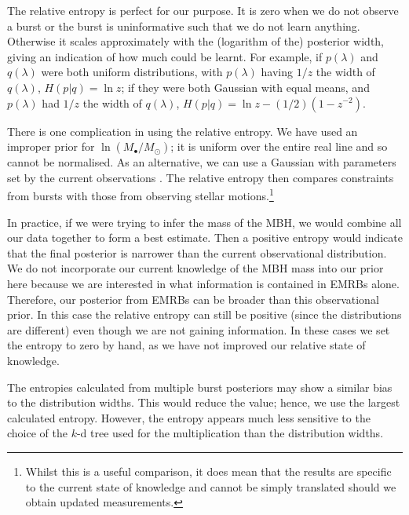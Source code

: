 The relative entropy is perfect for our purpose. It is zero when we do not observe a burst or the burst is uninformative such that we do not learn anything. Otherwise it scales approximately with the (logarithm of the) posterior width, giving an indication of how much could be learnt. For example, if $p(\lambda)$ and $q(\lambda)$ were both uniform distributions, with $p(\lambda)$ having $1/z$ the width of $q(\lambda)$, $H(p|q) = \ln z$; if they were both Gaussian with equal means, and $p(\lambda)$ had $1/z$ the width of $q(\lambda)$, $H(p|q) = \ln z - (1/2)(1 - z^{-2})$.

There is one complication in using the relative entropy. We have used an improper prior for $\ln (M_\bullet/M_\odot)$; it is uniform over the entire real line and so cannot be normalised. As an alternative, we can use a Gaussian with parameters set by the current observations \citep{Gillessen2009}. The relative entropy then compares constraints from bursts with those from observing stellar motions.\footnote{Whilst this is a useful comparison, it does mean that the results are specific to the current state of knowledge and cannot be simply translated should we obtain updated measurements.}

In practice, if we were trying to infer the mass of the MBH, we would combine all our data together to form a best estimate. Then a positive entropy would indicate that the final posterior is narrower than the current observational distribution. We do not incorporate our current knowledge of the MBH mass into our prior here because we are interested in what information is contained in EMRBs alone. Therefore, our posterior from EMRBs can be broader than this observational prior. In this case the relative entropy can still be positive (since the distributions are different) even though we are not gaining information. In these cases we set the entropy to zero by hand, as we have not improved our relative state of knowledge.

The entropies calculated from multiple burst posteriors may show a similar bias to the distribution widths. This would reduce the value; hence, we use the largest calculated entropy. However, the entropy appears much less sensitive to the choice of the $k$-d tree used for the multiplication than the distribution widths. %

